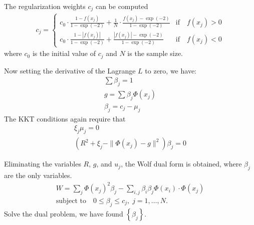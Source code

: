 \begin{frame}
The regularization weights $c_j$ can be computed
\begin{align}
c_j = \begin{cases}
c_0 \cdot \frac{1-f\left(x_j\right)}{1-\exp\left(-2\right)} + \frac{1}{N}\cdot \frac{f\left(x_j\right) - \exp\left(-2\right)}{1-\exp\left(-2\right)} & \text{if}\quad f\left(x_j\right) > 0\\
c_0 \cdot \frac{1-\left|f\left(x_j\right)\right|}{1-\exp\left(-2\right)} + \frac{\left|f\left(x_j\right)\right| - \exp\left(-2\right)}{1-\exp\left(-2\right)} & \text{if}\quad f\left(x_j\right) < 0
\end{cases}
\end{align}
where $c_0$ is the initial value of $c_j$ and $N$ is the sample size.
\end{frame}
\begin{frame}
Now setting the derivative of the Lagrange $L$ to zero, we have:
\begin{align}
\sum\beta_j=1\\
g=\sum\beta_j\Phi(x_j)\\
\beta_j=c_j-\mu_j
\end{align}  
The KKT conditions again require that
\begin{gather}
\xi_j\mu_j=0\\
\left(R^2+\xi_j-\|\Phi(x_j)-g\|^2\right)\beta_j=0
\end{gather} 
\end{frame}
\begin{frame}
Eliminating the variables $R$, $g$, and $u_j$, the Wolf dual form is obtained, where $\beta_j$ are the only variables.
\begin{gather}
W=\sum_j\Phi(x_j)^2\beta_j-\sum_{i,j}\beta_i\beta_j\Phi(x_i)\cdot\Phi(x_j)\\
\text{subject to}\quad 0\leq\beta_j\leq c_j, \; j=1,\ldots,N. 
\end{gather}
Solve the dual problem, we have found $\left\lbrace \beta_j \right\rbrace$.
\end{frame}
